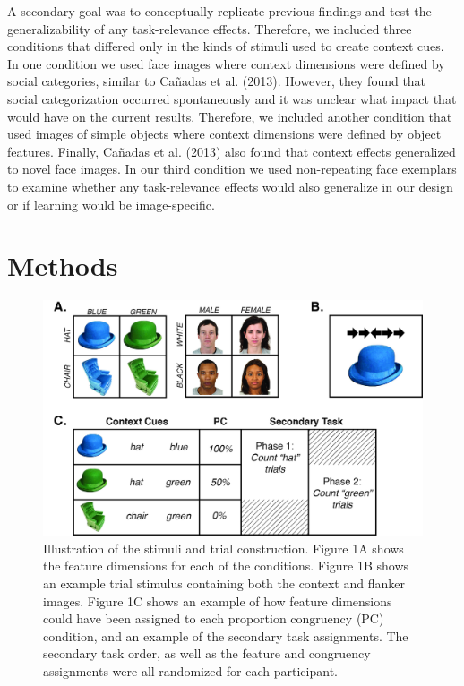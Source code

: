 \documentclass[english,,man,floatsintext]{apa6}
\begin{document}
A secondary goal was to conceptually replicate previous findings and test the generalizability of any task-relevance effects. Therefore, we included three conditions that differed only in the kinds of stimuli used to create context cues. In one condition we used face images where context dimensions were defined by social categories, similar to Cañadas et al. (2013). However, they found that social categorization occurred spontaneously and it was unclear what impact that would have on the current results. Therefore, we included another condition that used images of simple objects where context dimensions were defined by object features. Finally, Cañadas et al. (2013) also found that context effects generalized to novel face images. In our third condition we used non-repeating face exemplars to examine whether any task-relevance effects would also generalize in our design or if learning would be image-specific.

\hypertarget{methods}{%
\section{Methods}\label{methods}}

\begin{figure}
\centering
\includegraphics{images/Task.jpg}
\caption{\label{fig:figure1}Illustration of the stimuli and trial construction. Figure 1A shows the feature dimensions for each of the conditions. Figure 1B shows an example trial stimulus containing both the context and flanker images. Figure 1C shows an example of how feature dimensions could have been assigned to each proportion congruency (PC) condition, and an example of the secondary task assignments. The secondary task order, as well as the feature and congruency assignments were all randomized for each participant.}
\end{figure}
\end{document}
